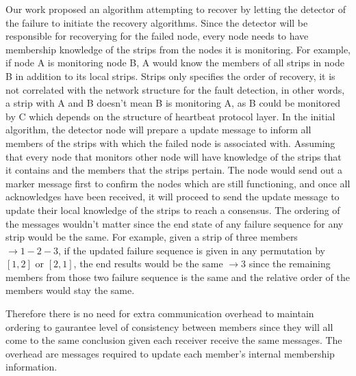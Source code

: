
Our work proposed an algorithm attempting to recover by letting the
detector of the failure to initiate the recovery algorithms.
Since the detector will be responsible for recoverying for the failed node,
every node needs to have membership knowledge of the strips from the nodes it
is monitoring. For example, if node A is monitoring node B, A would know the
members of all strips in node B in addition to its local strips. Strips only
specifies the order of recovery, it is not correlated with the network
structure for the fault detection, in other words, a strip with A and B doesn't
mean B is monitoring A, as B could be monitored by C which depends on the
structure of heartbeat protocol layer.
In the initial algorithm, the detector node will prepare a update message to
inform all members of the strips with which the failed node is associated with.
Assuming that every node that monitors other node will have knowledge of the
strips that it contains and the members that the strips pertain. The node would
send out a marker message first to confirm the nodes which are still
functioning, and once all acknowledges have been received, it will proceed to
send the update message to update their local knowledge of the strips to reach
a consensus. The ordering of the messages wouldn't matter since the end state
of any failure sequence for any strip would be the same. For example, given
a strip of three members $\rightarrow 1-2-3$, if the updated failure sequence
is given in any permutation by $[1, 2]$ or $[2, 1]$, the end results would be
the same $\rightarrow 3$ since the remaining members from those two failure
sequence is the same and the relative order of the members would stay the same.

Therefore there is no need for extra communication overhead to maintain
ordering to gaurantee level of consistency between members since they will all
come to the same conclusion given each receiver receive the same messages. The
overhead are messages required to update each member's internal membership
information.


